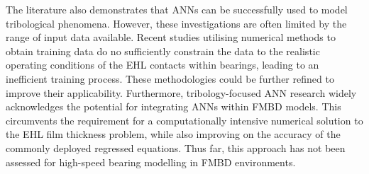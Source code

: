 The literature also demonstrates that ANNs can be successfully used to model tribological phenomena. However, these investigations are often limited by the range of input data available. Recent studies utilising numerical methods to obtain training data do no sufficiently constrain the data to the realistic operating conditions of the EHL contacts within bearings, leading to an inefficient training process. These methodologies could be further refined to improve their applicability. Furthermore, tribology-focused ANN research widely acknowledges the potential for integrating ANNs within FMBD models. This circumvents the requirement for a computationally intensive numerical solution to the EHL film thickness problem, while also improving on the accuracy of the commonly deployed regressed equations. Thus far, this approach has not been assessed for high-speed bearing modelling in FMBD environments.